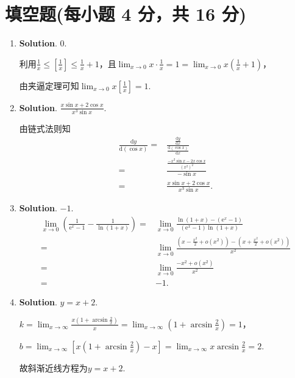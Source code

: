 \documentclass[../Main.tex]{subfiles}
\begin{document}
  \section{填空题(每小题 4 分，共 16 分)}
  \begin{enumerate}
    \item[7.] \textbf{Solution}. $0$.

      利用$\frac{1}{x}\leq\left[\frac{1}{x}\right]\leq\frac{1}{x}+1$，且$\lim_{x\to0}
      x\cdot\frac{1}{x}=1=\lim_{x\to0}x\left(\frac{1}{x}+1\right)$，

      由夹逼定理可知$\lim_{x\to0}x\left[\frac{1}{x}\right]=1$.

    \item[8.] \textbf{Solution}. $\frac{x\sin x+2\cos x}{x^{3}\sin x}$.

      由链式法则知
      \[
        \begin{aligned}
          \frac{\mathrm{d}y}{\mathrm{d}(\cos x)} = & \frac{\frac{\mathrm{d}y}{\mathrm{d}x}}{\frac{\mathrm{d}(\cos x)}{\mathrm{d}x}} \\
          =                                        & \frac{\frac{-x^{2}\sin x - 2x\cos x}{(x^{2})^{2}}}{-\sin x}                    \\
          =                                        & \frac{x\sin x+2\cos x}{x^{3}\sin x}.
        \end{aligned}
      \]

    \item[9.] \textbf{Solution}. $-1$.
      \[
        \begin{aligned}
          \lim_{x\to0}\left(\frac{1}{\mathrm{e}^x-1}-\frac{1}{\ln(1+x)}\right) = & \lim_{x\to0}\frac{\ln(1+x)-(\mathrm{e}^x-1)}{(\mathrm{e}^x-1)\ln(1+x)}                          \\
          =                                                                      & \lim_{x\to0}\frac{\left(x-\frac{x^2}{2}+o(x^2)\right)-\left(x+\frac{x^2}{2}+o(x^2)\right)}{x^2} \\
          =                                                                      & \lim_{x\to0}\frac{-x^2+o(x^2)}{x^2}                                                             \\
          =                                                                      & -1.
        \end{aligned}
      \]

    \item[10.] \textbf{Solution}. $y=x+2$.

      $k=\lim_{x\to\infty}\frac{x\left(1+\arcsin\frac{2}{x}\right)}{x}=\lim_{x\to\infty}
      \left(1+\arcsin\frac{2}{x}\right)=1$，

      $b=\lim_{x\to\infty}\left[x\left(1+\arcsin\frac{2}{x}\right)-x\right]=\lim_{x\to\infty}
      x\arcsin\frac{2}{x}=2$.

      故斜渐近线方程为$y=x+2$.
  \end{enumerate}
\end{document}
